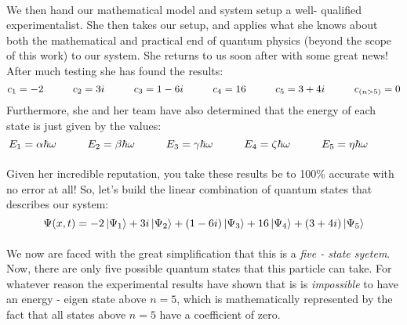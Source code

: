 \documentclass[12pt,letterpaper]{book}
\begin{document}
\paragraph*{}We then hand our mathematical model and system setup a well- qualified experimentalist. She then takes our setup, and applies what she knows about both the mathematical and practical end of quantum physics (beyond the scope of this work) to our system. She returns to us soon after with some great news! After much testing she has found the results:
\begin{equation}
c_1 = -2 \hspace*{1cm}
c_2 = 3i \hspace*{1cm}
c_3 = 1 - 6i \hspace{1cm}
c_4 = 16 \hspace*{1cm}
c_5 = 3 + 4i \hspace{1cm}
c_{(n > 5)} = 0
\end{equation}
Furthermore, she and her team have also determined that the energy of each state is just given by the values:
\begin{equation}
E_1 = \alpha\hbar\omega \hspace*{1cm} 
E_2 = \beta\hbar\omega \hspace*{1cm} 
E_3 = \gamma\hbar\omega \hspace*{1cm}
E_4 = \zeta\hbar\omega \hspace*{1cm} 
E_5 = \eta\hbar\omega \hspace*{1cm}
\end{equation}
\paragraph*{}Given her incredible reputation, you take these results be to 100\% accurate with no error at all! So, let's build the linear combination of quantum states that describes our system:
\begin{equation}
\Psi(x,t) = -2\ket{\Psi_1} + 3i\ket{\Psi_2} + (1-6i)\ket{\Psi_3} +
16\ket{\Psi_4} + (3 + 4i)\ket{\Psi_5}
\end{equation}
\paragraph*{}We now are faced with the great simplification that this is a \textit{five - state syetem}. Now, there are only five possible quantum states that this particle can take. For whatever reason the experimental results have shown that is is \textit{impossible} to have an energy - eigen state above $n = 5$, which is mathematically represented by the fact that all states above $n = 5$ have a coefficient of zero. 
\end{document}
